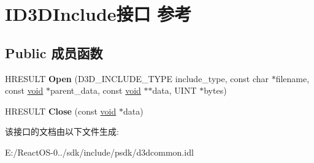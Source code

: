 \hypertarget{interface_i_d3_d_include}{}\section{I\+D3\+D\+Include接口 参考}
\label{interface_i_d3_d_include}
\subsection*{Public 成员函数}
\begin{DoxyCompactItemize}
\item 
\mbox{\label{interface_i_d3_d_include_aab345064b2bde9b49fd8e42ef10a4d2e}} 
H\+R\+E\+S\+U\+LT {\bfseries Open} (D3\+D\+\_\+\+I\+N\+C\+L\+U\+D\+E\+\_\+\+T\+Y\+PE include\+\_\+type, const char $\ast$filename, const \hyperlink{interfacevoid}{void} $\ast$parent\+\_\+data, const \hyperlink{interfacevoid}{void} $\ast$$\ast$data, U\+I\+NT $\ast$bytes)
\item 
\mbox{\label{interface_i_d3_d_include_af9e290168156b2d5769b9442acc3ddfe}} 
H\+R\+E\+S\+U\+LT {\bfseries Close} (const \hyperlink{interfacevoid}{void} $\ast$data)
\end{DoxyCompactItemize}


该接口的文档由以下文件生成\+:\begin{DoxyCompactItemize}
\item 
E\+:/\+React\+O\+S-\/0../sdk/include/psdk/d3dcommon.\+idl\end{DoxyCompactItemize}
